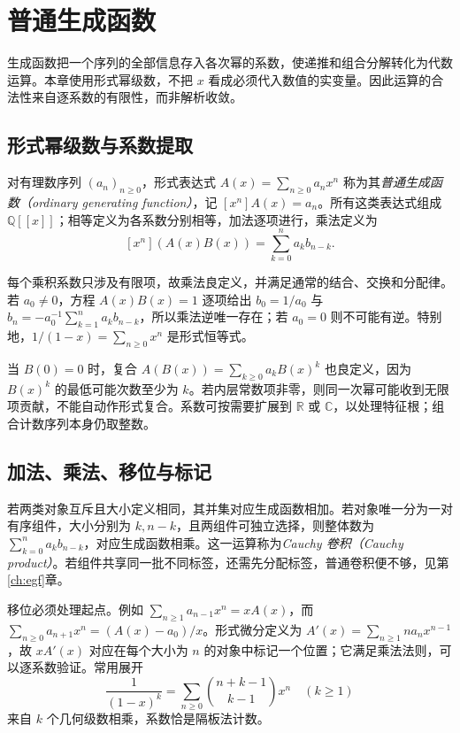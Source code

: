 \setcounter{chapter}{6} %
\chapter{普通生成函数}
\label{ch:ogf}

生成函数把一个序列的全部信息存入各次幂的系数，使递推和组合分解转化为代数运算。本章使用形式幂级数，不把 $x$ 看成必须代入数值的实变量。因此运算的合法性来自逐系数的有限性，而非解析收敛。

\section{形式幂级数与系数提取}

\begin{definition}
对有理数序列 $(a_n)_{n\ge0}$，形式表达式 $A(x)=\sum_{n\ge0}a_nx^n$ 称为其\emph{普通生成函数（ordinary generating function）}，记 $[x^n]A(x)=a_n$。所有这类表达式组成 $\mathbb Q[[x]]$；相等定义为各系数分别相等，加法逐项进行，乘法定义为
\[
 [x^n](A(x)B(x))=\sum_{k=0}^n a_kb_{n-k}.
\]
\end{definition}

每个乘积系数只涉及有限项，故乘法良定义，并满足通常的结合、交换和分配律。若 $a_0\ne0$，方程 $A(x)B(x)=1$ 逐项给出 $b_0=1/a_0$ 与 $b_n=-a_0^{-1}\sum_{k=1}^n a_kb_{n-k}$，所以乘法逆唯一存在；若 $a_0=0$ 则不可能有逆。特别地，$1/(1-x)=\sum_{n\ge0}x^n$ 是形式恒等式。

当 $B(0)=0$ 时，复合 $A(B(x))=\sum_{k\ge0}a_kB(x)^k$ 也良定义，因为 $B(x)^k$ 的最低可能次数至少为 $k$。若内层常数项非零，则同一次幂可能收到无限项贡献，不能自动作形式复合。系数可按需要扩展到 $\mathbb R$ 或 $\mathbb C$，以处理特征根；组合计数序列本身仍取整数。

\section{加法、乘法、移位与标记}

若两类对象互斥且大小定义相同，其并集对应生成函数相加。若对象唯一分为一对有序组件，大小分别为 $k,n-k$，且两组件可独立选择，则整体数为 $\sum_{k=0}^n a_kb_{n-k}$，对应生成函数相乘。这一运算称为\emph{Cauchy 卷积（Cauchy product）}。若组件共享同一批不同标签，还需先分配标签，普通卷积便不够，见第\ref{ch:egf}章。

移位必须处理起点。例如 $\sum_{n\ge1}a_{n-1}x^n=xA(x)$，而 $\sum_{n\ge0}a_{n+1}x^n=(A(x)-a_0)/x$。形式微分定义为 $A'(x)=\sum_{n\ge1}na_nx^{n-1}$，故 $xA'(x)$ 对应在每个大小为 $n$ 的对象中标记一个位置；它满足乘法法则，可以逐系数验证。常用展开
\begin{equation}
  \frac{1}{(1-x)^k}=\sum_{n\ge0}\binom{n+k-1}{k-1}x^n\quad(k\ge1)
  \label{eq:negative-binomial}
\end{equation}
来自 $k$ 个几何级数相乘，系数恰是隔板法计数。

